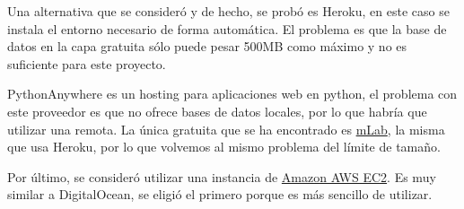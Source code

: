 Una alternativa que se consideró y de hecho, se probó es Heroku, en este caso se instala el entorno necesario de forma automática. El problema es que la base de datos en la capa gratuita sólo puede pesar 500MB como máximo y no es suficiente para este proyecto.

PythonAnywhere es un hosting para aplicaciones web en python, el problema con este proveedor es que no ofrece bases de datos locales, por lo que habría que utilizar una remota. La única gratuita que se ha encontrado es \href{https://mlab.com/}{mLab}, la misma que usa Heroku, por lo que volvemos al mismo problema del límite de tamaño.

Por último, se consideró utilizar una instancia de \href{https://aws.amazon.com/es/ec2/}{Amazon AWS EC2}. Es muy similar a DigitalOcean, se eligió el primero porque es más sencillo de utilizar.

